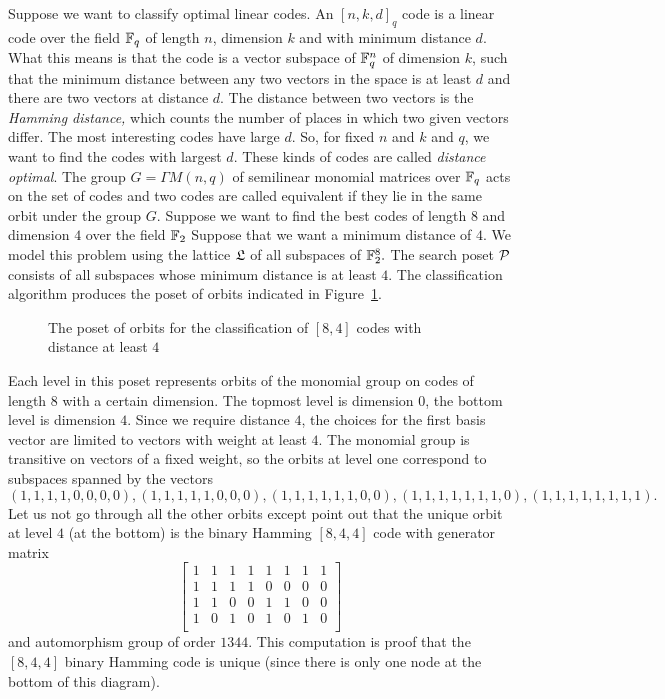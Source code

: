 Suppose we want to classify optimal linear codes. 
An $[n,k,d]_q$ code is a linear 
code over the field ${\mathbb F}_q$ of length $n$, 
dimension $k$ and with minimum distance $d.$ 
What this means is that the code is a vector subspace of ${\mathbb F}_q^n$ of dimension $k$, 
such that the minimum distance between any two vectors in the space is at least $d$ 
and there are two vectors at distance $d$. 
The distance between two vectors is the {\em Hamming distance,} 
which counts the number 
of places in which two given vectors differ. 
The most interesting codes 
have large $d$. 
So, for fixed $n$ and $k$ and $q$, we want to find the codes with largest $d$. 
These kinds of codes are called {\em distance optimal}. 
The group $G=\Gamma M(n,q)$ of semilinear monomial matrices over ${\mathbb F}_q$ 
acts on the set of codes 
and two codes are called equivalent 
if they lie in the same orbit under the group $G$.
Suppose we want to find the best codes of length $8$ and dimension $4$ over the field ${\mathbb F}_2$
Suppose that we want a minimum distance of $4$.
We model this problem using the lattice ${\mathfrak L}$ of all subspaces of ${\mathbb F}_2^8.$ 
The search poset ${\cal P}$ consists of all subspaces whose minimum distance is at least $4$. 
The classification algorithm produces the poset of orbits indicated in Figure~\ref{posetmonomialHamming}.
\begin{figure}
\begin{center}
 
\end{center}
\caption{\label{posetmonomialHamming}The poset of orbits for the classification of $[8,4]$ codes with distance at least $4$}
\end{figure}
Each level in this poset represents orbits of the monomial group on codes of length $8$ with a certain dimension.
The topmost level is dimension $0$, the bottom level is dimension $4$.
Since we require distance $4$, the choices for the first basis vector are limited to 
vectors with weight at least $4$. 
The monomial group is transitive on vectors of a fixed weight, so the orbits at level one correspond to 
subspaces spanned by the vectors 
$$
(1,1,1,1,0,0,0,0),
(1,1,1,1,1,0,0,0),
(1,1,1,1,1,1,0,0),
(1,1,1,1,1,1,1,0),
(1,1,1,1,1,1,1,1).
$$
Let us not go through all the other orbits except point out that the unique orbit at level $4$ (at the bottom) 
is the binary Hamming $[8,4,4]$ code with generator matrix
$$
\left[
\begin{array}{cccccccc}
1&1&1&1&1&1&1&1\\
1&1&1&1&0&0&0&0\\
1&1&0&0&1&1&0&0\\
1&0&1&0&1&0&1&0\\
\end{array}
\right]
$$
and automorphism group of order $1344$.
This computation is proof that the $[8,4,4]$ binary Hamming code is unique 
(since there is only one node at the bottom of this diagram).



